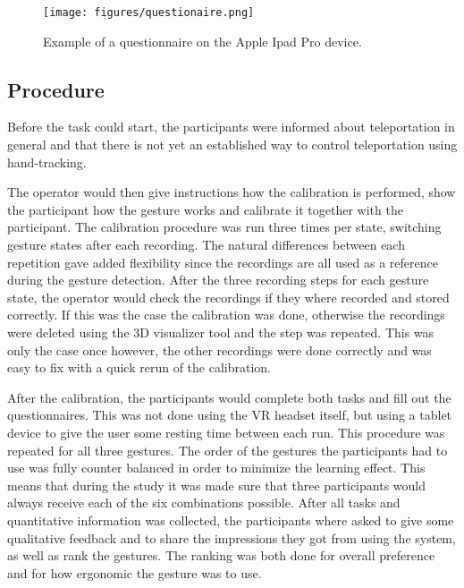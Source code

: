 \begin{figure}[!ht]
    \centering
    \texttt{[image: figures/questionaire.png]}
    \caption{Example of a questionnaire on the Apple Ipad Pro device.}
    \label{fig:Ipad}
\end{figure}

\subsection{Procedure}
Before the task could start, the participants were informed about teleportation in general and that there is not yet an established way to control teleportation using hand-tracking.

The operator would then give instructions how the calibration is performed, show the participant how the gesture works and calibrate it together with the participant. The calibration procedure was run three times per state, switching gesture states after each recording. The natural differences between each repetition gave added flexibility since the recordings are all used as a reference during the gesture detection. After the three recording steps for each gesture state, the operator would check the recordings if they where recorded and stored correctly. If this was the case the calibration was done, otherwise the recordings were deleted using the 3D visualizer tool and the step was repeated. This was only the case once however, the other recordings were done correctly and was easy to fix with a quick rerun of the calibration. 

After the calibration, the participants would complete both tasks and fill out the questionnaires. This was not done using the VR headset itself, but using a tablet device to give the user some resting time between each run. This procedure was repeated for all three gestures. 
The order of the gestures the participants had to use was fully counter balanced in order to minimize the learning effect. This means that during the study it was made sure that three participants would always receive each of the six combinations possible. 
After all tasks and quantitative information was collected, the participants where asked to give some qualitative feedback and to share the impressions they got from using the system, as well as rank the gestures. The ranking was both done for overall preference and for how ergonomic the gesture was to use.   


